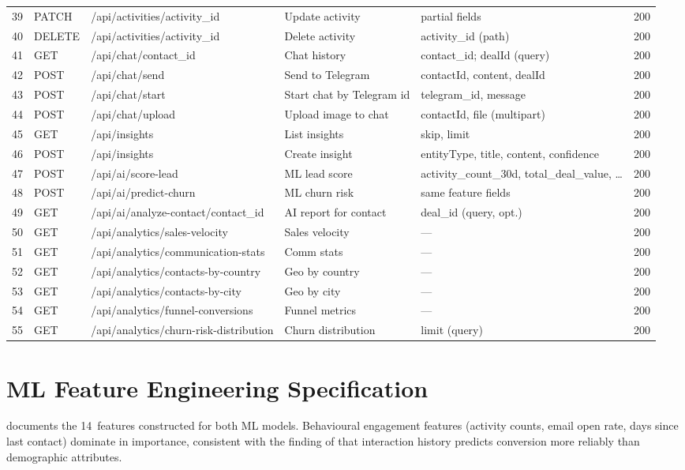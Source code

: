 \begin{longtable}{@{}C{0.4cm} C{1.5cm} L{5.5cm} L{3.8cm} L{3.4cm} C{1.4cm}@{}}
39 & PATCH & /api/activities/{activity\_id} & Update activity & partial fields & 200 \\
40 & DELETE & /api/activities/{activity\_id} & Delete activity & activity\_id (path) & 200 \\
41 & GET & /api/chat/{contact\_id} & Chat history & contact\_id; dealId (query) & 200 \\
42 & POST & /api/chat/send & Send to Telegram & contactId, content, dealId & 200 \\
43 & POST & /api/chat/start & Start chat by Telegram id & telegram\_id, message & 200 \\
44 & POST & /api/chat/upload & Upload image to chat & contactId, file (multipart) & 200 \\
45 & GET & /api/insights & List insights & skip, limit & 200 \\
46 & POST & /api/insights & Create insight & entityType, title, content, confidence & 200 \\
47 & POST & /api/ai/score-lead & ML lead score & activity\_count\_30d, total\_deal\_value, … & 200 \\
48 & POST & /api/ai/predict-churn & ML churn risk & same feature fields & 200 \\
49 & GET & /api/ai/analyze-contact/{contact\_id} & AI report for contact & deal\_id (query, opt.) & 200 \\
50 & GET & /api/analytics/sales-velocity & Sales velocity & — & 200 \\
51 & GET & /api/analytics/communication-stats & Comm stats & — & 200 \\
52 & GET & /api/analytics/contacts-by-country & Geo by country & — & 200 \\
53 & GET & /api/analytics/contacts-by-city & Geo by city & — & 200 \\
54 & GET & /api/analytics/funnel-conversions & Funnel metrics & — & 200 \\
55 & GET & /api/analytics/churn-risk-distribution & Churn distribution & limit (query) & 200 \\

\end{longtable}

\section{ML Feature Engineering Specification}
 
 documents the 14~features constructed for both ML
models. Behavioural engagement features (activity counts, email open rate,
days since last contact) dominate in importance, consistent with the
finding of \citet{tsai2010} that interaction history predicts conversion
more reliably than demographic attributes.
 
